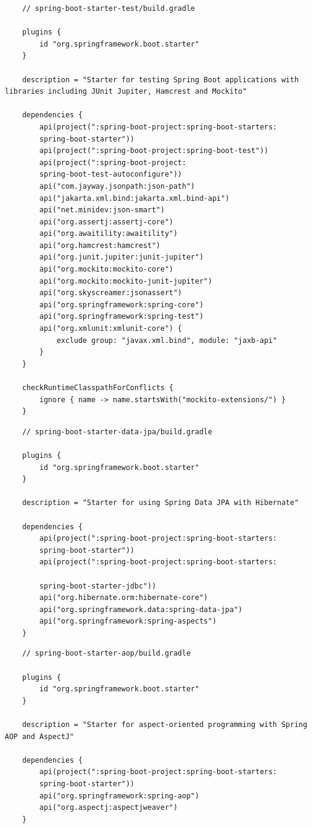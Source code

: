 \documentclass{scrartcl}
\begin{document}
\begin{lstlisting}
    // spring-boot-starter-test/build.gradle

    plugins {
        id "org.springframework.boot.starter"
    }

    description = "Starter for testing Spring Boot applications with libraries including JUnit Jupiter, Hamcrest and Mockito"

    dependencies {
        api(project(":spring-boot-project:spring-boot-starters:
        spring-boot-starter"))
        api(project(":spring-boot-project:spring-boot-test"))
        api(project(":spring-boot-project:
        spring-boot-test-autoconfigure"))
        api("com.jayway.jsonpath:json-path")
        api("jakarta.xml.bind:jakarta.xml.bind-api")
        api("net.minidev:json-smart")
        api("org.assertj:assertj-core")
        api("org.awaitility:awaitility")
        api("org.hamcrest:hamcrest")
        api("org.junit.jupiter:junit-jupiter")
        api("org.mockito:mockito-core")
        api("org.mockito:mockito-junit-jupiter")
        api("org.skyscreamer:jsonassert")
        api("org.springframework:spring-core")
        api("org.springframework:spring-test")
        api("org.xmlunit:xmlunit-core") {
            exclude group: "javax.xml.bind", module: "jaxb-api"
        }
    }

    checkRuntimeClasspathForConflicts {
        ignore { name -> name.startsWith("mockito-extensions/") }
    }
\end{lstlisting}
\begin{lstlisting}
    // spring-boot-starter-data-jpa/build.gradle

    plugins {
        id "org.springframework.boot.starter"
    }

    description = "Starter for using Spring Data JPA with Hibernate"

    dependencies {
        api(project(":spring-boot-project:spring-boot-starters:
        spring-boot-starter"))
        api(project(":spring-boot-project:spring-boot-starters:

        spring-boot-starter-jdbc"))
        api("org.hibernate.orm:hibernate-core")
        api("org.springframework.data:spring-data-jpa")
        api("org.springframework:spring-aspects")
    }
\end{lstlisting}
\begin{lstlisting}
    // spring-boot-starter-aop/build.gradle

    plugins {
        id "org.springframework.boot.starter"
    }

    description = "Starter for aspect-oriented programming with Spring AOP and AspectJ"

    dependencies {
        api(project(":spring-boot-project:spring-boot-starters:
        spring-boot-starter"))
        api("org.springframework:spring-aop")
        api("org.aspectj:aspectjweaver")
    }
\end{lstlisting}
\end{document}
